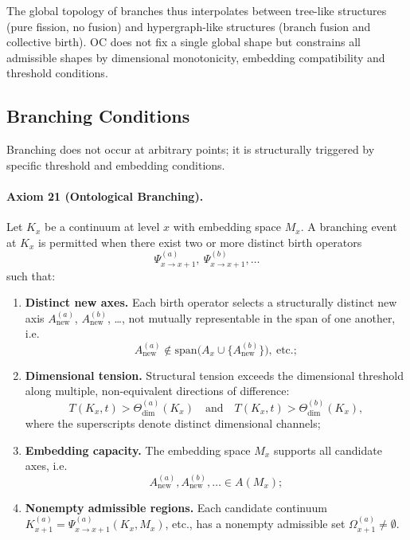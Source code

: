 The global topology of branches thus interpolates between tree-like structures
(pure fission, no fusion) and hypergraph-like structures (branch fusion and
collective birth). OC does not fix a single global shape but constrains all
admissible shapes by dimensional monotonicity, embedding compatibility and
threshold conditions.

\subsection{Branching Conditions}

Branching does not occur at arbitrary points; it is structurally triggered by
specific threshold and embedding conditions.

\paragraph{Axiom 21 (Ontological Branching).}
Let \(K_x\) be a continuum at level \(x\) with embedding space \(M_x\). A
branching event at \(K_x\) is permitted when there exist two or more distinct
birth operators
\[
  \Psi_{x\to x+1}^{(a)},\ \Psi_{x\to x+1}^{(b)},\dots
\]
such that:
\begin{enumerate}
  \item \textbf{Distinct new axes.}\quad
        Each birth operator selects a structurally distinct new axis
        \(A_{\mathrm{new}}^{(a)}\), \(A_{\mathrm{new}}^{(b)}\), \dots,
        not mutually representable in the span of one another, i.e.
        \[
          A_{\mathrm{new}}^{(a)} \notin \mathrm{span}
            \big(A_x \cup \{A_{\mathrm{new}}^{(b)}\}\big), \ \text{etc.};
        \]
  \item \textbf{Dimensional tension.}\quad
        Structural tension exceeds the dimensional threshold along multiple,
        non-equivalent directions of difference:
        \[
          T(K_x,t) > \Theta_{\mathrm{dim}}^{(a)}(K_x)
          \quad\text{and}\quad
          T(K_x,t) > \Theta_{\mathrm{dim}}^{(b)}(K_x),
        \]
        where the superscripts denote distinct dimensional channels;
  \item \textbf{Embedding capacity.}\quad
        The embedding space \(M_x\) supports all candidate axes, i.e.
        \[
          A_{\mathrm{new}}^{(a)}, A_{\mathrm{new}}^{(b)}, \dots
          \in A(M_x);
        \]
  \item \textbf{Nonempty admissible regions.}\quad
        Each candidate continuum
        \(K_{x+1}^{(a)} = \Psi_{x\to x+1}^{(a)}(K_x, M_x)\), etc., has
        a nonempty admissible set \(\Omega_{x+1}^{(a)}\neq\emptyset\).
\end{enumerate}

